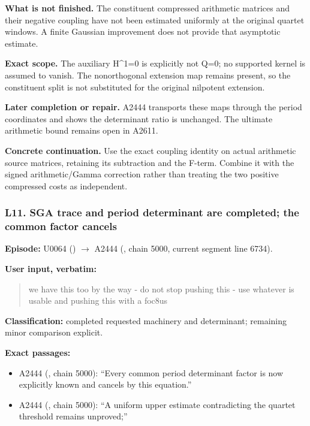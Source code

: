 \textbf{What is not finished.} The constituent compressed arithmetic
matrices and their negative coupling have not been estimated uniformly
at the original quartet windows. A finite Gaussian improvement does not
provide that asymptotic estimate.

\textbf{Exact scope.} The auxiliary H\^{}1=0 is explicitly not Q=0; no
supported kernel is assumed to vanish. The nonorthogonal extension map
remains present, so the constituent split is not substituted for the
original nilpotent extension.

\textbf{Later completion or repair.} A2444 transports these maps through
the period coordinates and shows the determinant ratio is unchanged. The
ultimate arithmetic bound remains open in A2611.

\textbf{Concrete continuation.} Use the exact coupling identity on
actual arithmetic source matrices, retaining its subtraction and the
F-term. Combine it with the signed arithmetic/Gamma correction rather
than treating the two positive compressed costs as independent.

\subsubsection{L11. SGA trace and period determinant are completed; the
common factor
cancels}\label{l11.-sga-trace-and-period-determinant-are-completed-the-common-factor-cancels}

\textbf{Episode:} U0064
(\protect{})
\allowbreak{}\ensuremath{→}\allowbreak{} A2444
(\protect{}, chain 5000,
current segment line 6734).

\textbf{User input, verbatim:}

\begin{quote}
we have this too by the way - do not stop pushing this - use whatever is
usable and pushing this with a foc8us
\end{quote}

\textbf{Classification:} completed requested machinery and determinant;
remaining minor comparison explicit.

\textbf{Exact passages:}

\begin{itemize}
\tightlist
\item
  A2444 (\protect{}, chain
  5000): ``Every common period determinant factor is now explicitly
  known and cancels by this equation.''
\item
  A2444 (\protect{}, chain
  5000): ``A uniform upper estimate contradicting the quartet threshold
  remains unproved;''
\end{itemize}


